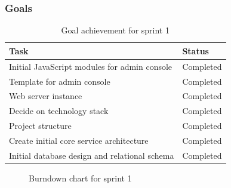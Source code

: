 \subsubsection{Goals}
\label{subsec:project_lifecycle-development-sprint_1-goals}

\begin{center}
\begin{table}[ht!]
\small
\centering
\begin{tabular}{|p{10cm}|p{2cm}|}
\hline
\rowcolor{lightgray}
 \textbf{Task} & \textbf{Status} \\
\hline
\rowcolor{green!30}
 Initial JavaScript modules for admin console & Completed  \\
 \rowcolor{green!30}
 Template for admin console & Completed \\ 
 \rowcolor{green!30}
 Web server instance & Completed \\ 
 \rowcolor{green!30}
 Decide on technology stack & Completed \\ 
 \rowcolor{green!30}
 Project structure & Completed \\
 \rowcolor{green!30}
 Create initial core service architecture & Completed \\
 \rowcolor{green!30}
 Initial database design and relational schema & Completed \\
\hline
\end{tabular}
\caption{Goal achievement for sprint 1}
\label{tab:sprint 1, goals}
\end{table}
\end{center}

\begin{center}
  \begin{figure}[htbp!]
    \caption{Burndown chart for sprint 1}
    \label{fig:sprint 1, burndown}
  \end{figure}
\end{center}

